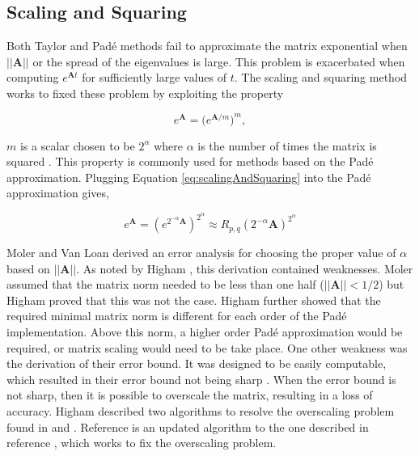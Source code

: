 \subsection{Scaling and Squaring}
Both Taylor and Pad\'e methods fail to approximate the matrix exponential when $||\boldsymbol{A}||$ or the spread of the eigenvalues is large. This problem is exacerbated when computing $e^{\boldsymbol{A}t}$ for sufficiently large values of $t$. The scaling and squaring method works to fixed these problem by exploiting the property

\begin{equation*}
    e^{\boldsymbol{A}} = \big( e^{\boldsymbol{A}/m}\big)^{m}
    \label{eq:scalingAndSquaring},
\end{equation*}

\noindent $m$ is a scalar chosen to be $2^{\alpha}$ where $\alpha$ is the number of times the matrix is squared \cite{moler2003}. This property is commonly used for methods based on the Pad\'e approximation. Plugging Equation \ref{eq:scalingAndSquaring} into the Pad\'e approximation gives,

\begin{equation}
    e^{\boldsymbol{A}} = (e^{2^{-\alpha}\boldsymbol{A}})^{2^{\alpha}} \approx R_{p,q}(2^{-\alpha}\boldsymbol{A})^{2^{\alpha}}
\end{equation}

Moler and Van Loan \cite{moler2003} derived an error analysis for choosing the proper value of $\alpha$ based on $||\boldsymbol{A}||$. As noted by Higham \cite{higham2005}, this derivation contained weaknesses. Moler assumed that the matrix norm needed to be less than one half ($||\boldsymbol{A}|| < 1/2$) but Higham proved that this was not the case. Higham further showed that the required minimal matrix norm is different for each order of the Pad\'e implementation. Above this norm, a higher order Pad\'e approximation would be required, or matrix scaling would need to be take place. One other weakness was the derivation of their error bound. It was designed to be easily computable, which resulted in their error bound not being sharp \cite{higham2005}. When the error bound is not sharp, then it is possible to overscale the matrix, resulting in a loss of accuracy. Higham described two algorithms to resolve the overscaling problem found in \cite{higham2005} and \cite{higham2009}. Reference \cite{higham2009} is an updated algorithm to the one described in reference \cite{higham2005}, which works to fix the overscaling problem. 

